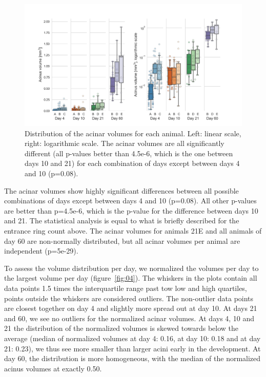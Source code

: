 \documentclass[
  american,
]{article}
\begin{document}
\begin{figure}
\hypertarget{fig:03}{%
\centering
\includegraphics{images/fig03.png}
\caption{Distribution of the acinar volumes for each animal.
Left: linear scale, right: logarithmic scale.
The acinar volumes are all significantly different (all p-values better than 4.5e-6, which is the one between days 10 and 21) for each combination of days except between days 4 and 10 (p=0.08).}\label{fig:03}
}
\end{figure}

The acinar volumes show highly significant differences between all possible combinations of days except between days 4 and 10 (p=0.08).
All other p-values are better than p=4.5e-6, which is the p-value for the difference between days 10 and 21.
The statistical analysis is equal to what is briefly described for the entrance ring count above.
The acinar volumes for animals 21E and all animals of day 60 are non-normally distributed, but all acinar volumes per animal are independent (p=5e-29).

To assess the volume distribution per day, we normalized the volumes per day to the largest volume per day (figure~\ref{fig:04}).
The whiskers in the plots contain all data points 1.5 times the interquartile range past tow low and high quartiles, points outside the whiskers are considered outliers.
The non-outlier data points are closest together on day 4 and slightly more spread out at day 10.
At days 21 and 60, we see no outliers for the normalized acinar volumes.
At days 4, 10 and 21 the distribution of the normalized volumes is skewed towards below the average (median of normalized volumes at day 4: 0.16, at day 10: 0.18 and at day 21: 0.23), we thus see more smaller than larger acini early in the development.
At day 60, the distribution is more homogeneous, with the median of the normalized acinus volumes at exactly 0.50.
\end{document}
